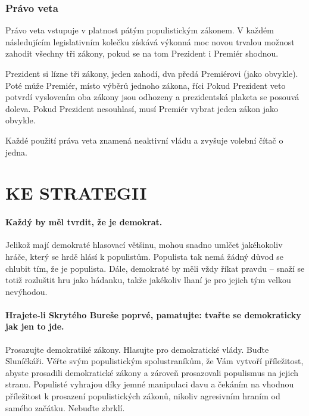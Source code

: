 \documentclass{article}
\begin{document}
        \subsubsection*{Právo veta}

            Právo veta vstupuje v platnost pátým populistickým zákonem. V každém následujícím legislativním kolečku získává výkonná moc novou trvalou možnost zahodit všechny tři zákony, pokud se na tom Prezident i Premiér shodnou.

            Prezident si lízne tři zákony, jeden zahodí, dva předá Premiérovi (jako obvykle). Poté může Premiér, místo výběrů jednoho zákona, říci  Pokud Prezident veto potvrdí vyslovením  oba zákony jsou odhozeny a prezidentská plaketa se posouvá doleva. Pokud Prezident nesouhlasí, musí Premiér vybrat jeden zákon jako obvykle.

            Každé použití práva veta znamená neaktivní vládu a zvyšuje volební čítač o jedna.

    \section*{KE STRATEGII}

        \paragraph{Každý by měl tvrdit, že je demokrat.} Jelikož mají demokraté hlasovací většinu, mohou snadno umlčet jakéhokoliv hráče, který se hrdě hlásí k populistům. Populista tak nemá žádný důvod se chlubit tím, že je populista. Dále, demokraté by měli vždy říkat pravdu -- snaží se totiž rozluštit hru jako hádanku, takže jakékoliv lhaní je pro jejich tým velkou nevýhodou.

        \paragraph{Hrajete-li Skrytého Bureše poprvé, pamatujte: tvařte se demokraticky jak jen to jde.} Prosazujte demokratiké zákony. Hlasujte pro demokratické vlády. Buďte Sluníčkáři. Věřte svým populistickým spolustraníkům, že Vám vytvoří příležitost, abyste prosadili demokratické zákony a zároveň prosazovali populismus na jejich stranu. %
        Populisté vyhrajou díky jemné manipulaci davu a čekáním na vhodnou příležitost k prosazení populistických zákonů, nikoliv agresivním hraním od samého začátku. Nebuďte zbrklí.
\end{document}
